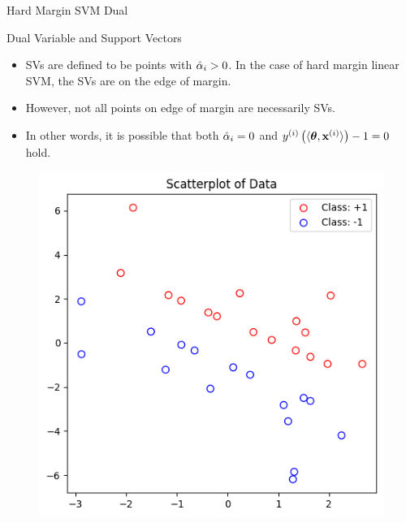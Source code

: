 \documentclass[11pt,compress,t,notes=noshow, xcolor=table]{beamer}
\begin{document}
\begin{vbframe}{Hard Margin SVM Dual}
\end{vbframe}

\begin{vbframe}{Dual Variable and Support Vectors}
  \begin{itemize}
      \item SVs are defined to be points with $\hat{\alpha}_i > 0$. In the case of hard margin linear SVM, the SVs are on the edge of margin.
      \item However, not all points on edge of margin are necessarily SVs.
      \item In other words, it is possible that both $\hat{\alpha}_i = 0$ and $y^{(i)} \left(\langle\bm{\theta}, \mathbf{x}^{(i)} \rangle \right) - 1 = 0$ hold.
  \end{itemize}

  \begin{minipage}[t]{0.4\columnwidth}
    \begin{figure}
      \centering
      \includegraphics[width=\columnwidth]{figure/linear_svm_support_vectors_1.png}
    \end{figure}
  \end{minipage}
  \hfill
  \begin{minipage}[t]{0.4\columnwidth}
    \begin{figure}
      \centering

\end{figure}
\end{minipage}
\end{vbframe}
\end{document}
